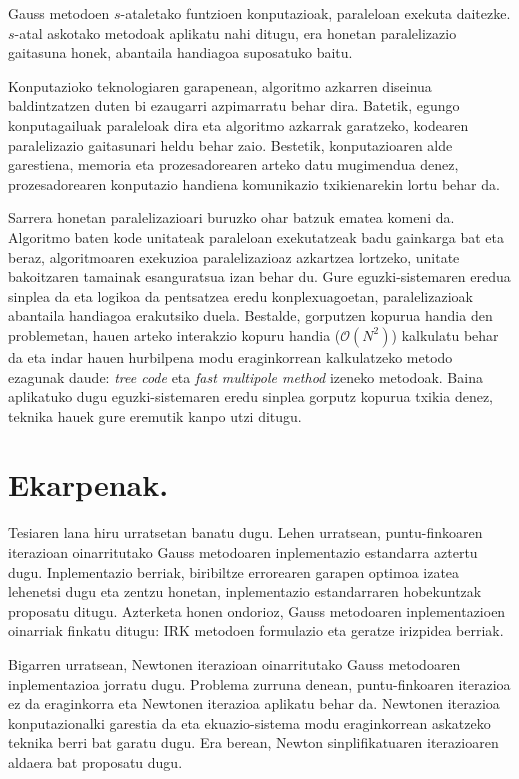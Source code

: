 Gauss metodoen $s$-ataletako funtzioen konputazioak, paraleloan exekuta daitezke. $s$-atal askotako metodoak aplikatu nahi ditugu, era honetan paralelizazio gaitasuna honek, abantaila handiagoa suposatuko baitu.

Konputazioko teknologiaren garapenean, algoritmo azkarren diseinua baldintzatzen duten bi ezaugarri azpimarratu behar dira. Batetik, egungo konputagailuak paraleloak dira eta algoritmo azkarrak garatzeko, kodearen paralelizazio gaitasunari heldu behar zaio. Bestetik, konputazioaren alde garestiena, memoria eta prozesadorearen arteko datu mugimendua denez, prozesadorearen konputazio handiena komunikazio txikienarekin lortu behar da.  

Sarrera honetan paralelizazioari buruzko ohar batzuk ematea komeni da. Algoritmo baten kode unitateak paraleloan exekutatzeak badu gainkarga bat eta beraz,  algoritmoaren exekuzioa paralelizazioaz azkartzea lortzeko,  unitate bakoitzaren tamainak esanguratsua izan behar du. Gure eguzki-sistemaren eredua sinplea da eta logikoa da pentsatzea eredu konplexuagoetan, paralelizazioak abantaila handiagoa erakutsiko duela. Bestalde, gorputzen kopurua handia den problemetan, hauen arteko interakzio kopuru  handia ($\mathcal{O}(N^2)$) kalkulatu behar da  eta indar hauen hurbilpena modu eraginkorrean kalkulatzeko metodo ezagunak daude: \textit {tree code}\cite{Barnes1986} eta \textit {fast multipole method}\cite{Carrier1988} izeneko metodoak. Baina aplikatuko dugu eguzki-sistemaren eredu sinplea  gorputz kopurua txikia denez, teknika hauek gure eremutik kanpo utzi ditugu. 


\section{Ekarpenak.}


Tesiaren lana hiru urratsetan banatu dugu. Lehen urratsean, puntu-finkoaren iterazioan oinarritutako Gauss metodoaren inplementazio estandarra aztertu dugu. Inplementazio berriak, biribiltze errorearen garapen optimoa izatea lehenetsi dugu eta zentzu honetan, inplementazio estandarraren hobekuntzak proposatu ditugu. Azterketa honen ondorioz, Gauss metodoaren inplementazioen oinarriak finkatu ditugu: IRK metodoen formulazio eta geratze irizpidea berriak.

Bigarren urratsean, Newtonen iterazioan oinarritutako Gauss metodoaren inplementazioa jorratu dugu. Problema zurruna denean, puntu-finkoaren iterazioa ez da eraginkorra eta Newtonen iterazioa aplikatu behar da. Newtonen iterazioa konputazionalki garestia da eta ekuazio-sistema modu eraginkorrean askatzeko teknika berri bat garatu dugu. Era berean, Newton sinplifikatuaren iterazioaren aldaera bat proposatu dugu. 


